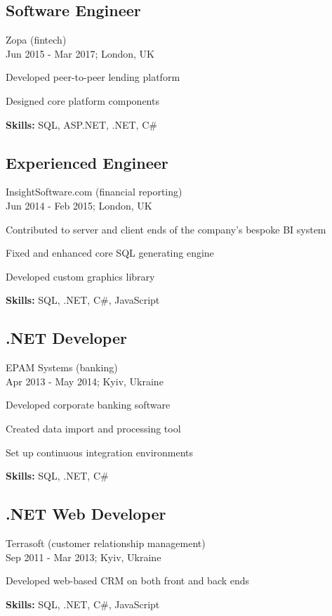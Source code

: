 \documentclass[a4paper,10pt]{article}
\begin{document}
\subsection*{Software Engineer}
Zopa (fintech) \\
Jun 2015 - Mar 2017; London, UK \\
\begin{bulletlist}
    \item Developed peer-to-peer lending platform
    \item Designed core platform components
\end{bulletlist}
\textbf{Skills:} SQL, ASP.NET, .NET, C\#

\subsection*{Experienced Engineer}
InsightSoftware.com (financial reporting) \\
Jun 2014 - Feb 2015; London, UK \\
\begin{bulletlist}
    \item Contributed to server and client ends of the company's bespoke BI system
    \item Fixed and enhanced core SQL generating engine
    \item Developed custom graphics library
\end{bulletlist}
\textbf{Skills:} SQL, .NET, C\#, JavaScript

\subsection*{.NET Developer}
EPAM Systems (banking) \\
Apr 2013 - May 2014; Kyiv, Ukraine \\
\begin{bulletlist}
    \item Developed corporate banking software
    \item Created data import and processing tool
    \item Set up continuous integration environments
\end{bulletlist}
\textbf{Skills:} SQL, .NET, C\#

\subsection*{.NET Web Developer}
Terrasoft (customer relationship management) \\
Sep 2011 - Mar 2013; Kyiv, Ukraine \\
\begin{bulletlist}
    \item Developed web-based CRM on both front and back ends
\end{bulletlist}
\textbf{Skills:} SQL, .NET, C\#, JavaScript
\end{document}
